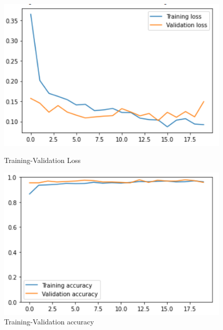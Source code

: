 \documentclass[11pt,a4paper]{article}
\theoremstyle{definition}
\begin{document}
\begin{figure}[H]
  \centering
  \begin{minipage}[b]{0.45\textwidth}
    \includegraphics[scale=0.75]{./images/v2-2loss}
	\caption{Training-Validation Loss}
  \end{minipage}
  \hfill
  \begin{minipage}[b]{0.45\textwidth}
    \includegraphics[scale=0.75]{./images/v2-2acc}
	\caption{Training-Validation accuracy}
  \end{minipage}
\end{figure}
\end{document}
